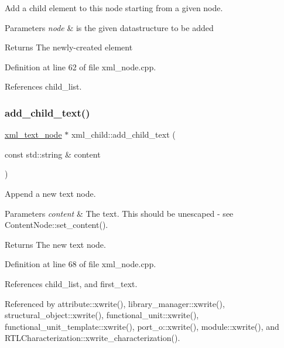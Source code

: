 Add a child element to this node starting from a given node. 


\begin{DoxyParams}{Parameters}
{\em node} & is the given datastructure to be added \\
\hline
\end{DoxyParams}
\begin{DoxyReturn}{Returns}
The newly-\/created element 
\end{DoxyReturn}


Definition at line 62 of file xml\+\_\+node.\+cpp.



References child\+\_\+list.

\mbox{\label{classxml__child_aed891875a02dccfdcf459956e728f872}} 
\subsubsection{\texorpdfstring{add\+\_\+child\+\_\+text()}{add\_child\_text()}}
{\footnotesize\ttfamily \hyperlink{classxml__text__node}{xml\+\_\+text\+\_\+node} $\ast$ xml\+\_\+child\+::add\+\_\+child\+\_\+text (\begin{DoxyParamCaption}\item[{const std\+::string \&}]{content }\end{DoxyParamCaption})}



Append a new text node. 


\begin{DoxyParams}{Parameters}
{\em content} & The text. This should be unescaped -\/ see Content\+Node\+::set\+\_\+content(). \\
\hline
\end{DoxyParams}
\begin{DoxyReturn}{Returns}
The new text node. 
\end{DoxyReturn}


Definition at line 68 of file xml\+\_\+node.\+cpp.



References child\+\_\+list, and first\+\_\+text.



Referenced by attribute\+::xwrite(), library\+\_\+manager\+::xwrite(), structural\+\_\+object\+::xwrite(), functional\+\_\+unit\+::xwrite(), functional\+\_\+unit\+\_\+template\+::xwrite(), port\+\_\+o\+::xwrite(), module\+::xwrite(), and R\+T\+L\+Characterization\+::xwrite\+\_\+characterization().

